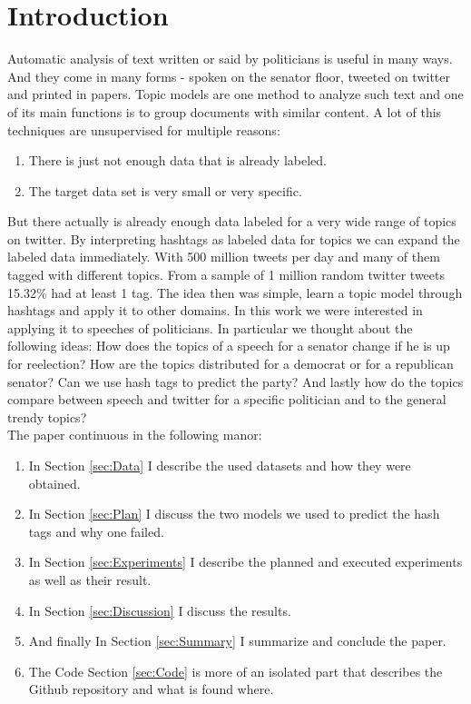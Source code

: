 \documentclass[10pt,conference,compsocconf]{IEEEtran}
\begin{document}
\section{Introduction}
Automatic analysis of text written or said by politicians is useful in many ways. And they come in many forms - spoken on the senator floor, tweeted on twitter and printed in papers. 
Topic models are one method to analyze such text and one of its main functions is to group documents with similar content. A lot of this techniques are unsupervised for multiple reasons: \begin{enumerate}
	\item There is just not enough data that is already labeled. 
	\item The target data set is very small or very specific. 
\end{enumerate} 
But there actually is already enough data labeled for a very wide range of topics on twitter. By interpreting hashtags as labeled data for topics we can expand the labeled data immediately. With 500 million tweets per day \cite{twitter_stats} and many of them tagged with different topics. From a sample of 1 million random twitter tweets 15.32\% had at least 1 tag. The idea then was simple, learn a topic model through hashtags and apply it to other domains. In this work we were interested in applying it to speeches of politicians. In particular we thought about the following ideas: How does the topics of a speech for a senator change if he is up for reelection? How are the topics distributed for a democrat or for a republican senator? Can we use hash tags to predict the party? And lastly how do the topics compare between speech and twitter for a specific politician and to the general trendy topics? \\
The paper continuous in the following manor: 
\begin{enumerate}
	\item In Section \ref{sec:Data} I describe the used datasets and how they were obtained. \\
	\item In Section \ref{sec:Plan} I discuss the two models we used to predict the hash tags and why one failed. \\
	\item In Section \ref{sec:Experiments} I describe the planned and executed experiments as well as their result.\\
	\item In Section \ref{sec:Discussion} I discuss the results.\\
	
	\item And finally In Section \ref{sec:Summary} I summarize and conclude the paper. \\
	\item The Code Section \ref{sec:Code} is more of an isolated part that describes the Github repository and what is found where. 
\end{enumerate}
\end{document}
